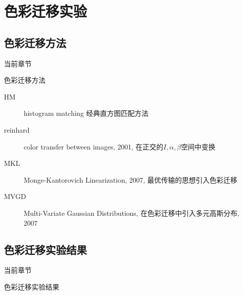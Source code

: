 \section{色彩迁移实验}

\subsection{色彩迁移方法}
\begin{frame}{当前章节}
\end{frame}

\begin{frame}{色彩迁移方法} 
    \begin{description}
        \item[HM] histogram matching 经典直方图匹配方法
        \item[reinhard] color transfer between images, 2001, 在正交的$I, \alpha, \beta$空间中变换
        \item[MKL] Monge-Kantorovich Linearization, 2007, 最优传输的思想引入色彩迁移
        \item[MVGD] Multi-Variate Gaussian Distributions, 在色彩迁移中引入多元高斯分布, 2007
    \end{description}
    
\end{frame}

\subsection{色彩迁移实验结果}
\begin{frame}{当前章节}
\end{frame}

\begin{frame}{色彩迁移实验结果}
    \begin{figure}[!htbp]
        \centering
        \\[0.1cm]
        \\[0.1cm]
        \label{fig:0201}
    \end{figure}
\end{frame}

